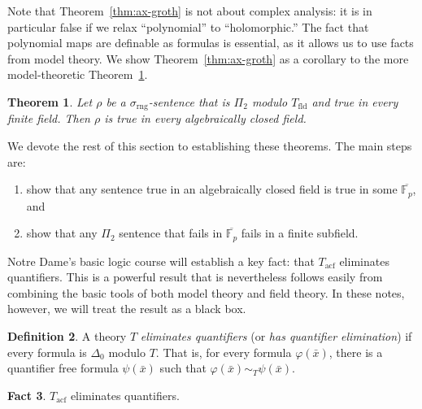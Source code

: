 \documentclass{article}
\theoremstyle{plain}
\newtheorem{thm}{Theorem}[section]
\theoremstyle{definition}
\newtheorem{defn}[thm]{Definition}
\newtheorem{fact}[thm]{Fact}
\newcommand{\defterm}{\emph}
\newcommand{\ringsig}{\sigma_{\operatorname{rng}}}
\newcommand{\fieldthy}{T_{\operatorname{fld}}}
\newcommand{\acf}{T_{\operatorname{acf}}}
\newcommand{\tuple}{\bar}
\renewcommand{\phi}{\varphi}
\begin{document}
Note that Theorem~\ref{thm:ax-groth} is not about complex analysis: it
is in particular false if we relax ``polynomial'' to ``holomorphic.''
The fact that polynomial maps are definable as formulas is essential,
as it allows us to use facts from model theory. We show
Theorem~\ref{thm:ax-groth} as a corollary to the more model-theoretic
Theorem~\ref{thm:ax-groth-modeltheory}.

\begin{thm}\label{thm:ax-groth-modeltheory}
  Let $\rho$ be a $\ringsig$-sentence that is $\Pi_2$ modulo
  $\fieldthy$ and true in every finite field. Then $\rho$ is true in
  every algebraically closed field.
\end{thm}

We devote the rest of this section to establishing these theorems. The
main steps are:
\begin{enumerate}
\item show that any sentence true in an algebraically closed field is
  true in some $\overline{\mathbb{F}_p}$, and
\item show that any $\Pi_2$ sentence that fails in
  $\overline{\mathbb{F}_p}$ fails in a finite subfield.
\end{enumerate}

Notre Dame's basic logic course will establish a key fact: that $\acf$
eliminates quantifiers. This is a powerful result that is nevertheless
follows easily from combining the basic tools of both model theory and
field theory. In these notes, however, we will treat the result as a
black box.

\begin{defn}
  A theory $T$ \defterm{eliminates quantifiers} (or \defterm{has
    quantifier elimination}) if every formula is $\Delta_0$ modulo
  $T$. That is, for every formula $\phi(\tuple{x})$, there is a
  quantifier free formula $\psi(\tuple{x})$ such that $\phi(\tuple{x})
  \sim_T \psi(\tuple{x})$.
\end{defn}

\begin{fact}\label{fact:acf-qe}
  $\acf$ eliminates quantifiers.
\end{fact}
\end{document}
